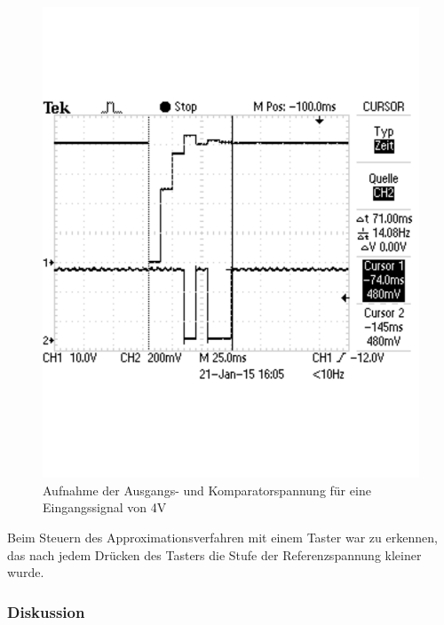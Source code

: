 \documentclass[12pt,a4paper]{article}
\begin{document}
\begin{figure}[H]
  \centering 	
    \includegraphics[trim = 0mm 50mm 0mm 50mm, clip, scale = 0.4]{2_2_4V.pdf}
  	\caption[Aufnahme der Ausgangs- und Komparatorspannung für eine Eingangssignal von 4V]{Aufnahme der Ausgangs- und Komparatorspannung für eine Eingangssignal von 4V} 
  \label{fig:2_2_4V}
\end{figure}

Beim Steuern des Approximationsverfahren mit einem Taster war zu erkennen, das nach jedem Drücken des Tasters die Stufe der Referenzspannung kleiner wurde.

\subsubsection*{Diskussion}
\end{document}
